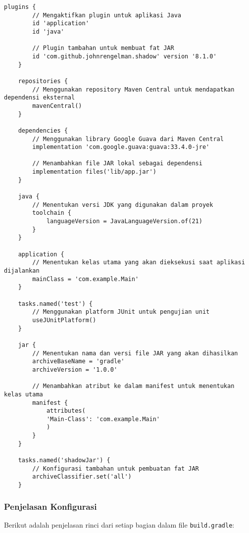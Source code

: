 \begin{lstlisting}[style=JavaStyle]
	plugins {
		// Mengaktifkan plugin untuk aplikasi Java
		id 'application'
		id 'java'
		
		// Plugin tambahan untuk membuat fat JAR
		id 'com.github.johnrengelman.shadow' version '8.1.0'
	}
	
	repositories {
		// Menggunakan repository Maven Central untuk mendapatkan dependensi eksternal
		mavenCentral()
	}
	
	dependencies {
		// Menggunakan library Google Guava dari Maven Central
		implementation 'com.google.guava:guava:33.4.0-jre'
		
		// Menambahkan file JAR lokal sebagai dependensi
		implementation files('lib/app.jar')
	}
	
	java {
		// Menentukan versi JDK yang digunakan dalam proyek
		toolchain {
			languageVersion = JavaLanguageVersion.of(21)
		}
	}
	
	application {
		// Menentukan kelas utama yang akan dieksekusi saat aplikasi dijalankan
		mainClass = 'com.example.Main'
	}
	
	tasks.named('test') {
		// Menggunakan platform JUnit untuk pengujian unit
		useJUnitPlatform()
	}
	
	jar {
		// Menentukan nama dan versi file JAR yang akan dihasilkan
		archiveBaseName = 'gradle'
		archiveVersion = '1.0.0'
		
		// Menambahkan atribut ke dalam manifest untuk menentukan kelas utama
		manifest {
			attributes(
			'Main-Class': 'com.example.Main'
			)
		}
	}
	
	tasks.named('shadowJar') {
		// Konfigurasi tambahan untuk pembuatan fat JAR
		archiveClassifier.set('all')
	}
\end{lstlisting}

\subsubsection{Penjelasan Konfigurasi}
Berikut adalah penjelasan rinci dari setiap bagian dalam file \texttt{build.gradle}:

